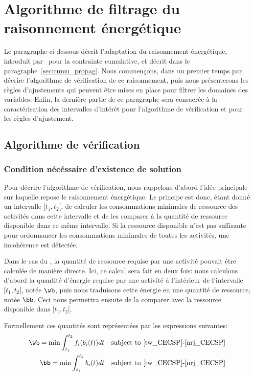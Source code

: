 \section{Algorithme de filtrage du raisonnement énergétique}
\label{sec:ER_CECSP}

Le paragraphe ci-dessous décrit l'adaptation du raisonnement
énergétique, introduit par~\cite{RELopez} pour la contrainte cumulative,
et décrit dans le paragraphe~\ref{sec:cumu_propag}. Nous commençons,
dans un premier temps par décrire l'algorithme de vérification de ce
raisonnement, puis nous présenterons les règles d'ajustements qui
peuvent être mises en place pour filtrer les domaines des
variables. Enfin, la dernière partie de ce paragraphe sera consacrée à
la caractérisation des intervalles d'intérêt pour l'algorithme de
vérification et pour les règles d'ajustement.

\subsection{Algorithme de vérification}

\subsubsection{Condition nécéssaire d'existence de solution}
Pour décrire l'algorithme de vérification, nous rappelons d'abord
l'idée principale sur laquelle repose le raisonnement énergétique. Le
principe est donc, étant donné un intervalle $[t_1,t_2[$, de calculer
les consommations minimales de ressource des activités dans cette
intervalle et de les comparer à la quantité de ressource disponible
dans ce même intervalle. Si la ressource disponible n'est pas
suffisante pour ordonnancer les consommations minimales de toutes les
activités, une incohérence est détectée.

Dans le cas du \CUSP, la quantité de ressource requise par une
activité pouvait être calculée de manière directe. Ici, ce calcul sera
fait en deux fois: nous calculons d'abord la quantité d'énergie
requise par une activité à l'intérieur de l'intervalle $[t_1,t_2{[}$,
notée $\wb$, puis nous traduisons cette énergie en une quantité de
ressource, notée $\bb$. Ceci nous permettra ensuite de la comparer
avec la ressource disponible dans $[t_1,t_2{[}$.

Formellement ces quantités sont représentées par les expressions
suivantes: 
\begin{align}
  \wb= \min \int_{t_1}^{t_2} f_i(b_i(t))dt & & \text{subject to
\eqref{tw_CECSP}-\eqref{nrj_CECSP}}\\
  \bb= \min \int_{t_1}^{t_2} b_i(t)dt & & \text{subject to
\eqref{tw_CECSP}-\eqref{nrj_CECSP}}
\end{align}

